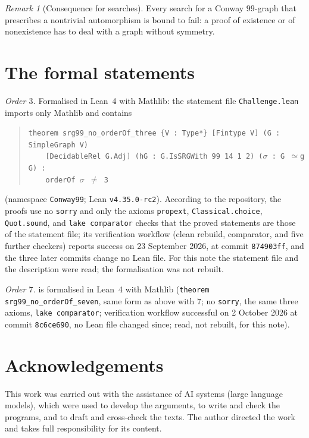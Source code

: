 \documentclass[11pt]{amsart}
\theoremstyle{remark}
\newtheorem{remark}[theorem]{Remark}
\begin{document}
\begin{remark}[Consequence for searches]
Every search for a Conway $99$-graph that prescribes a nontrivial automorphism is bound to fail: a proof of existence or of
nonexistence has to deal with a graph without symmetry.
\end{remark}

\appendix
\section{The formal statements}\label{app:lean}

\emph{Order $3$.} Formalised in
Lean~4 with Mathlib: the statement file \texttt{Challenge.lean} imports only Mathlib and contains
\begin{quote}\footnotesize
\texttt{theorem srg99\_no\_orderOf\_three \{V : Type*\} [Fintype V] (G : SimpleGraph V)}\\
\texttt{\ \ \ \ [DecidableRel G.Adj] (hG : G.IsSRGWith 99 14 1 2) ($\sigma$ : G $\simeq$g G) :}\\
\texttt{\ \ \ \ orderOf $\sigma$ $\neq$ 3}
\end{quote}
(namespace \texttt{Conway99}; Lean \texttt{v4.35.0-rc2}). According to the repository, the proofs use no \texttt{sorry} and
only the axioms \texttt{propext}, \texttt{Classical.choice}, \texttt{Quot.sound}, and \texttt{lake comparator} checks that
the proved statements are those of the statement file; its verification workflow (clean rebuild, comparator, and five
further checkers) reports success on 23 September 2026, at commit \texttt{874903ff}, and the three later commits change no
Lean file. For this note the statement file and the description were read; the formalisation was not rebuilt.

\emph{Order $7$.} \cite{D7} is formalised in Lean~4 with Mathlib
(\texttt{theorem srg99\_no\_orderOf\_seven}, same form as above with $7$; no \texttt{sorry}, the same three axioms,
\texttt{lake comparator}; verification workflow successful on 2 October 2026 at commit \texttt{8c6ce690}, no Lean file
changed since; read, not rebuilt, for this note).

\section*{Acknowledgements}
This work was carried out with the assistance of AI systems (large language models), which were used to develop the
arguments, to write and check the programs, and to draft and cross-check the texts. The author directed the work and takes
full responsibility for its content.
\end{document}
